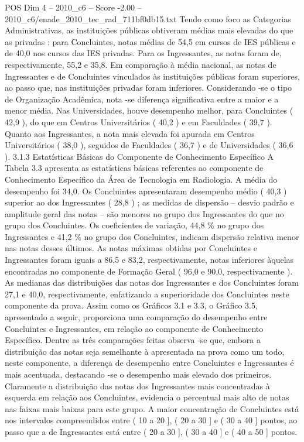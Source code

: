 \begin{textsample}{POS Dim 4 – 2010\_c6 – Score -2.00 – 2010\_c6/enade\_2010\_tec\_rad\_711bf0db15.txt}
Tendo como foco as Categorias Administrativas, as instituições públicas obtiveram médias mais elevadas do que as privadas : para Concluintes, notas médias de 54,5 em cursos de IES públicas e de 40,0 nos cursos das IES privadas.
Para os Ingressantes, as notas foram de, respectivamente, 55,2 e 35,8.
Em comparação à média nacional, as notas de Ingressantes e de Concluintes vinculados às instituições públicas foram superiores, ao passo que, nas instituições privadas foram inferiores.
Considerando -se o tipo de Organização Acadêmica, nota -se diferença significativa entre a maior e a menor média.
Nas Universidades, houve desempenho melhor, para Concluintes ( 42,9 ), do que em Centros Universitários ( 40,2 ) e em Faculdades ( 39,7 ).
Quanto aos Ingressantes, a nota mais elevada foi apurada em Centros Universitários ( 38,0 ), seguidos de Faculdades ( 36,7 ) e de Universidades ( 36,6 ). 3.1.3 Estatísticas Básicas do Componente de Conhecimento Específico A Tabela 3.3 apresenta as estatísticas básicas referentes ao componente de Conhecimento Específico da Área de Tecnologia em Radiologia.
A média do desempenho foi 34,0.
Os Concluintes apresentaram desempenho médio ( 40,3 ) superior ao dos Ingressantes ( 28,8 ) ; as medidas de dispersão – desvio padrão e amplitude geral das notas – são menores no grupo dos Ingressantes do que no grupo dos Concluintes.
Os coeficientes de variação, 44,8 \% no grupo dos Ingressantes e 41,2 \% no grupo dos Concluintes, indicam dispersão relativa menor nas notas desses últimos.
As notas máximas obtidas por Concluintes e Ingressantes foram iguais a 86,5 e 83,2, respectivamente, notas inferiores àquelas encontradas no componente de Formação Geral ( 96,0 e 90,0, respectivamente ).
As medianas das distribuições das notas dos Ingressantes e dos Concluintes foram 27,1 e 40,0, respectivamente, enfatizando a superioridade dos Concluintes neste componente da prova.
Assim como os Gráficos 3.1 e 3.3, o Gráfico 3.5, apresentado a seguir, proporciona uma comparação do desempenho entre Concluintes e Ingressantes, em relação ao componente de Conhecimento Específico.
Dentre as três comparações feitas observa -se que, embora a distribuição das notas seja semelhante à apresentada na prova como um todo, neste componente, a diferença de desempenho entre Concluintes e Ingressantes é mais acentuada, destacando -se o desempenho mais elevado dos primeiros.
Claramente a distribuição das notas dos Ingressantes mais concentradas à esquerda em relação aos Concluintes, evidencia o percentual mais alto de notas nas faixas mais baixas para este grupo.
A maior concentração de Concluintes está nos intervalos compreendidos entre ( 10 a 20 ], ( 20 a 30 ] e ( 30 a 40 ] pontos, ao passo que a de Ingressantes está entre ( 20 a 30 ], ( 30 a 40 ] e ( 40 a 50 ] pontos.

\end{textsample}

